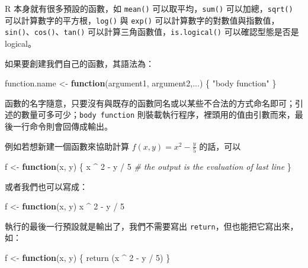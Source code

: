 \documentclass[
]{book}
\newenvironment{Shaded}{\begin{snugshade}}{\end{snugshade}}
\newcommand{\CommentTok}[1]{\textcolor[rgb]{0.56,0.35,0.01}{\textit{#1}}}
\newcommand{\ControlFlowTok}[1]{\textcolor[rgb]{0.13,0.29,0.53}{\textbf{#1}}}
\newcommand{\DecValTok}[1]{\textcolor[rgb]{0.00,0.00,0.81}{#1}}
\newcommand{\FunctionTok}[1]{\textcolor[rgb]{0.00,0.00,0.00}{#1}}
\newcommand{\NormalTok}[1]{#1}
\newcommand{\OtherTok}[1]{\textcolor[rgb]{0.56,0.35,0.01}{#1}}
\newcommand{\SpecialCharTok}[1]{\textcolor[rgb]{0.00,0.00,0.00}{#1}}
\newcommand{\StringTok}[1]{\textcolor[rgb]{0.31,0.60,0.02}{#1}}
\theoremstyle{definition}
\theoremstyle{remark}
\begin{document}
R 本身就有很多預設的函數，如 \texttt{mean()} 可以取平均，\texttt{sum()} 可以加總，\texttt{sqrt()} 可以計算數字的平方根，\texttt{log()} 與 \texttt{exp()} 可以計算數字的對數值與指數值，\texttt{sin()}、\texttt{cos()}、\texttt{tan()} 可以計算三角函數值，\texttt{is.logical()} 可以確認型態是否是 logical。

如果要創建我們自己的函數，其語法為：

\begin{Shaded}
\begin{Highlighting}[]
\NormalTok{function.name }\OtherTok{\textless{}{-}} \ControlFlowTok{function}\NormalTok{(argument1, argument2,...) \{}
  \StringTok{"body function"}
\NormalTok{\}}
\end{Highlighting}
\end{Shaded}

函數的名字隨意，只要沒有與既存的函數同名或以某些不合法的方式命名即可；引述的數量可多可少；\texttt{body\ function} 則裝載執行程序，裡頭用的值由引數而來，最後一行命令則會回傳成輸出。

例如若想新建一個函數來協助計算 \(f(x, y)=x^2 - \frac{y}{5}\) 的話，可以

\begin{Shaded}
\begin{Highlighting}[]
\NormalTok{f }\OtherTok{\textless{}{-}} \ControlFlowTok{function}\NormalTok{(x, y) \{}
\NormalTok{  x }\SpecialCharTok{\^{}} \DecValTok{2} \SpecialCharTok{{-}}\NormalTok{ y }\SpecialCharTok{/} \DecValTok{5}  \CommentTok{\# the output is the evaluation of last line}
\NormalTok{\}}
\end{Highlighting}
\end{Shaded}

或者我們也可以寫成：

\begin{Shaded}
\begin{Highlighting}[]
\NormalTok{f }\OtherTok{\textless{}{-}} \ControlFlowTok{function}\NormalTok{(x, y) x }\SpecialCharTok{\^{}} \DecValTok{2} \SpecialCharTok{{-}}\NormalTok{ y }\SpecialCharTok{/} \DecValTok{5}
\end{Highlighting}
\end{Shaded}

執行的最後一行預設就是輸出了，我們不需要寫出 \texttt{return}，但也能把它寫出來，如：

\begin{Shaded}
\begin{Highlighting}[]
\NormalTok{f }\OtherTok{\textless{}{-}} \ControlFlowTok{function}\NormalTok{(x, y) \{ }
  \FunctionTok{return}\NormalTok{ (x }\SpecialCharTok{\^{}} \DecValTok{2} \SpecialCharTok{{-}}\NormalTok{ y }\SpecialCharTok{/} \DecValTok{5}\NormalTok{)}
\NormalTok{\}}
\end{Highlighting}
\end{Shaded}
\end{document}
